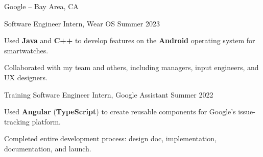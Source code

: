\begin{entry}{Google -- Bay Area, CA}

	\entryItem
		{Software Engineer Intern, Wear OS}
		{Summer 2023}
	
		\begin{items}
			\item Used \textbf{Java} and \textbf{C++} to develop features on the \textbf{Android} operating system for smartwatches.
			\item Collaborated with my team and others, including managers, input engineers, and UX designers.
		\end{items}

	\entryItem
		{Training Software Engineer Intern, Google Assistant}
		{Summer 2022}

		\begin{items}
			\item Used \textbf{Angular} (\textbf{TypeScript}) to create reusable components for Google's issue-tracking platform.
			\item Completed entire development process: design doc, implementation, documentation, and launch.
		\end{items}

\end{entry}
